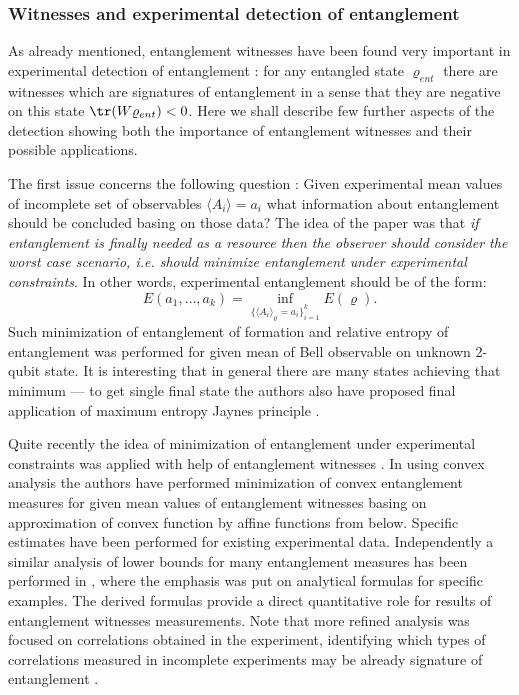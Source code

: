 \documentclass[twocolumn,aps,rmp]{revtex4}
\begin{document}
\subsubsection{Witnesses and experimental detection of entanglement}
\label{subsec:wit_exp_ent_det}

As already mentioned, entanglement witnesses have been found very
important in experimental detection of entanglement
\cite{sep1996,Terhal2000-laa}: for any entangled state $\varrho_{ent}$
there are witnesses which are signatures of entanglement in a sense
that they are negative on this state ${\tr}(W\varrho_{ent})<0$. Here
we shall describe few further aspects of the detection showing both
the importance of entanglement witnesses and their possible
applications.

The first issue concerns the following question \cite{Jaynes}: Given
experimental mean values of incomplete set of observables $\langle
A_{i} \rangle=a_{i}$ what information about entanglement should be
concluded basing on those data? The idea of the paper was that {\it if
  entanglement is finally needed as a resource then the observer
  should consider the worst case scenario, i.e.  should minimize
  entanglement under experimental constraints}. In other words,
experimental entanglement should be of the form:
\begin{equation}
E(a_{1},\ldots,a_{k})={\inf}_{\{ \langle A_{i}\rangle_\varrho=a_{i}
\}_{i=1}^{k}} E(\varrho).
\end{equation}
Such minimization of entanglement of formation and relative entropy of
entanglement was performed for given mean of Bell observable on
unknown 2-qubit state. It is interesting that in general there are
many states achieving that minimum --- to get single final state the
authors also have proposed final application of maximum entropy Jaynes
principle \cite{Jaynes}.

Quite recently the idea of minimization of entanglement under
experimental constraints was applied with help of entanglement
witnesses \cite{Reimpell,EisertBA}. In \cite{Reimpell} using convex
analysis the authors have performed minimization of convex
entanglement measures for given mean values of entanglement witnesses
basing on approximation of convex function by affine functions from
below. Specific estimates have been performed for existing
experimental data. Independently a similar analysis of lower bounds
for many entanglement measures has been performed in \cite{EisertBA},
where the emphasis was put on analytical formulas for specific
examples. The derived formulas \cite{Reimpell,EisertBA} provide a
direct quantitative role for results of entanglement witnesses
measurements. Note that more refined analysis was focused on
correlations obtained in the experiment, identifying which types of
correlations measured in incomplete experiments may be already
signature of entanglement \cite{PlenioA}.
\end{document}
